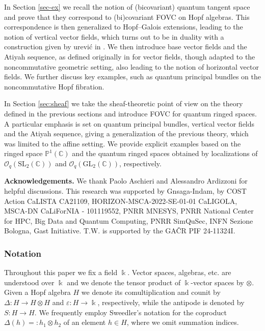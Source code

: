 \documentclass{article}
\theoremstyle{definition}
\begin{document}
	
	\medskip
	In Section \ref{sec-ex} we recall the notion of (bicovariant) quantum tangent space and prove that they correspond to (bi)covariant FOVC on Hopf algebras. This correspondence is then generalized to Hopf--Galois extensions, leading to the notion of vertical vector fields, which turns out to be in duality with a construction given by \DJ ur\dj evi\'c in \cite{DurI, DurII}.
	We then introduce base vector fields and the Atiyah sequence, as defined originally in \cite{atiyah} for vector fields, though
	adapted to the noncommutative geometric setting, also leading to the notion of horizontal	vector fields. We further discuss key examples, such as quantum principal bundles on the noncommutative Hopf fibration.
	
	\medskip
	In Section \ref{sec:sheaf} we take the sheaf-theoretic point of view on the theory defined in the previous sections and introduce FOVC for quantum ringed spaces. A particular emphasis is set on quantum principal bundles, vertical vector fields and the Atiyah sequence, giving a generalization of the previous theory, which was limited to the affine setting. We provide explicit examples based on the ringed space $\mathbb{P}^1(\mathbb{C})$ and the quantum ringed spaces obtained by localizations of $\mathcal{O}_q(\mathrm{SL}_2(\mathbb{C}))$ and $\mathcal{O}_q(\mathrm{GL}_2(\mathbb{C}))$, respectively.
	
	\bigskip
	{\bf Acknowledgements.} We thank Paolo Aschieri and Alessandro Ardizzoni for helpful discussions.
	This research was supported by Gnsaga-Indam, by
	COST Action CaLISTA CA21109, HORIZON-MSCA-2022-SE-01-01 CaLIGOLA, MSCA-DN CaLiForNIA - 101119552,
	PNRR MNESYS, PNRR National Center for HPC, Big Data and Quantum Computing, PNRR SimQuSec, INFN Sezione Bologna,
	Gast Initiative.  
	T.W. is supported by the GA\v{C}R PIF 24-11324I.
	
	
	\subsubsection*{Notation}
	
	Throughout this paper we fix a field $\Bbbk$. Vector spaces, algebras, etc. are understood over $\Bbbk$ and we denote the tensor product of $\Bbbk$-vector spaces by $\otimes$. Given a Hopf algebra $H$ we denote its comultiplication and counit by $\Delta\colon H\to H\otimes H$ and $\varepsilon\colon H\to\Bbbk$, respectively, while the antipode is denoted by $S\colon H\to H$. We frequently employ Sweedler's notation for the coproduct $\Delta(h)=:h_1\otimes h_2$ of an element $h\in H$, where we omit summation indices.
	
\end{document}
